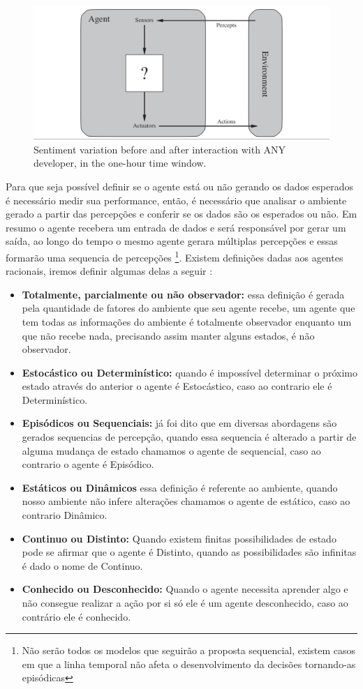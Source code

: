 \begin{figure}
    \centering
    \includegraphics[width=.8\textwidth]{imagens/rational_agent_draw.png}
    \caption{Sentiment variation before and after interaction with ANY developer, in the one-hour time window.}
    \label{fig:rational_agent_draw}
\end{figure}

Para que seja possível definir se o agente está ou não gerando os dados esperados é necessário medir sua performance, então, é necessário que analisar o ambiente gerado a partir das percepções e conferir se os dados são os esperados ou não. Em resumo o agente recebera um entrada de dados e será responsável por gerar um saída, ao longo do tempo o mesmo agente gerara múltiplas percepções e essas formarão uma sequencia de percepções \footnote{Não serão todos os modelos que seguirão a proposta sequencial, existem casos em que a linha temporal não afeta o desenvolvimento da decisões tornando-as episódicas}. Existem definições dadas aos agentes racionais, iremos definir algumas delas a seguir \cite[34-45]{russell2003artificial}:

\begin{itemize}
 \item \textbf{Totalmente, parcialmente ou não observador:} essa definição é gerada pela quantidade de fatores do ambiente que seu agente recebe, um agente que tem todas as informações do ambiente é totalmente observador enquanto um que não recebe nada, precisando assim manter alguns estados, é não observador.
 \item \textbf{Estocástico ou Determinístico:} quando é impossível determinar o próximo estado através do anterior o agente é Estocástico, caso ao contrario ele é Determinístico.
 \item \textbf{Episódicos ou Sequenciais:} já foi dito que em diversas abordagens são gerados sequencias de percepção, quando essa sequencia é alterado a partir de alguma mudança de estado chamamos o agente de sequencial, caso ao contrario o agente é Episódico.
 \item \textbf{Estáticos ou Dinâmicos} essa definição é referente ao ambiente, quando nosso ambiente não infere alterações chamamos o agente de estático, caso ao contrario Dinâmico.
 \item \textbf{Continuo ou Distinto:} Quando existem finitas possibilidades de estado pode se afirmar que o agente é Distinto, quando as possibilidades são infinitas é dado o nome de Continuo.
 \item \textbf{Conhecido ou Desconhecido:} Quando o agente necessita aprender algo e não consegue realizar a ação por si só ele é um agente desconhecido, caso ao contrário ele é conhecido.
\end{itemize}

